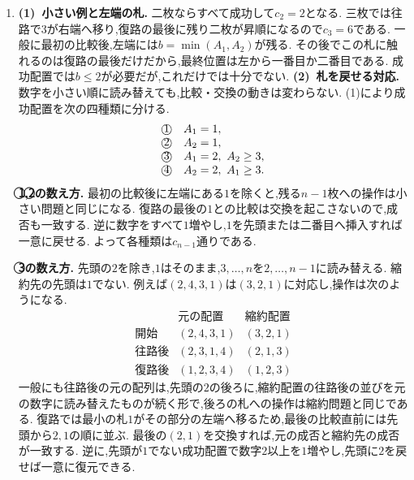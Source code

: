 \begin{enumerate}[label=\textbf{問\arabic*.},leftmargin=3.8em,format=\bookitemlink{practice-entrance}{solution}{problem}]
    結論$na_n\to\frac{1}{4}$は,$a_n$の減少の速さが$\frac{1}{4n}$のそれに近づくことを表す.
    このように,を求めなくても,からの主要な性質を決められる.
  \item \textbf{(1)~小さい例と左端の札.}
    二枚ならすべて成功して$c_2=2$となる.
    三枚では往路で$3$が右端へ移り,復路の最後に残り二枚が昇順になるので$c_3=6$である.
    一般に最初の比較後,左端には$b=\min(A_1,A_2)$が残る.
    その後でこの札に触れるのは復路の最後だけだから,最終位置は左から一番目か二番目である.
    成功配置では$b\le2$が必要だが,これだけでは十分でない.
    \smallskip\textbf{(2)~札を戻せる対応.}
    数字を小さい順に読み替えても,比較・交換の動きは変わらない.
    (1)により成功配置を次の四種類に分ける.
    \[
      \begin{array}{ll}
        \text{\textcircled{1}}&A_1=1,\\
        \text{\textcircled{2}}&A_2=1,\\
        \text{\textcircled{3}}&A_1=2,\ A_2\ge3,\\
        \text{\textcircled{4}}&A_2=2,\ A_1\ge3.
      \end{array}
    \]
    \textbf{\textcircled{1},\textcircled{2}の数え方.}
    最初の比較後に左端にある$1$を除くと,残る$n-1$枚への操作は小さい問題と同じになる.
    復路の最後の$1$との比較は交換を起こさないので,成否も一致する.
    逆に数字をすべて$1$増やし,$1$を先頭または二番目へ挿入すれば一意に戻せる.
    よって各種類は$c_{n-1}$通りである.
    \par\textbf{\textcircled{3}の数え方.}
    先頭の$2$を除き,$1$はそのまま,$3,\ldots,n$を$2,\ldots,n-1$に読み替える.
    縮約先の先頭は$1$でない.
    例えば$(2,4,3,1)$は$(3,2,1)$に対応し,操作は次のようになる.
    \[
      \begin{array}{c|c|c}
        &\text{元の配置}&\text{縮約配置}\\ \hline
        \text{開始}&(2,4,3,1)&(3,2,1)\\
        \text{往路後}&(2,3,1,4)&(2,1,3)\\
        \text{復路後}&(1,2,3,4)&(1,2,3)
      \end{array}
    \]
    一般にも往路後の元の配列は,先頭の$2$の後ろに,縮約配置の往路後の並びを元の数字に読み替えたものが続く形で,後ろの札への操作は縮約問題と同じである.
    復路では最小の札$1$がその部分の左端へ移るため,最後の比較直前には先頭から$2,1$の順に並ぶ.
    最後の$(2,1)$を交換すれば,元の成否と縮約先の成否が一致する.
    逆に,先頭が$1$でない成功配置で数字$2$以上を$1$増やし,先頭に$2$を戻せば一意に復元できる.

\end{enumerate}
